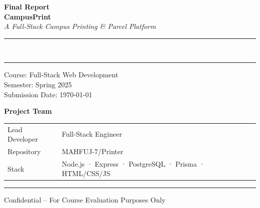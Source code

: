 \documentclass[12pt,a4paper]{report}
\begin{document}
\begin{titlepage}
  \centering
  \vspace*{1.5cm}

  {\Huge\bfseries\color{primary} Final Report}\\[0.5em]
  {\LARGE\bfseries CampusPrint}\\[0.3em]
  {\large\textit{A Full-Stack Campus Printing \& Parcel Platform}}

  \vspace{1cm}
  \rule{\linewidth}{1.5pt}\\[0.4em]
  \rule{\linewidth}{0.4pt}

  \vspace{1.5cm}

  \vspace{1.5cm}
  {\large Course: Full-Stack Web Development}\\[0.3em]
  {\large Semester: Spring 2025}\\[0.3em]
  {\large Submission Date: \today}

  \vspace{2cm}
  {\large\textbf{Project Team}}\\[0.4em]
  \begin{tabular}{@{}ll@{}}
    Lead Developer  & Full-Stack Engineer \\
    Repository      & MAHFUJ-7/Printer \\
    Stack           & Node.js · Express · PostgreSQL · Prisma · HTML/CSS/JS \\
  \end{tabular}

  \vfill
  \rule{\linewidth}{0.4pt}
  {\small Confidential -- For Course Evaluation Purposes Only}
\end{titlepage}

\tableofcontents
\clearpage
\end{document}
